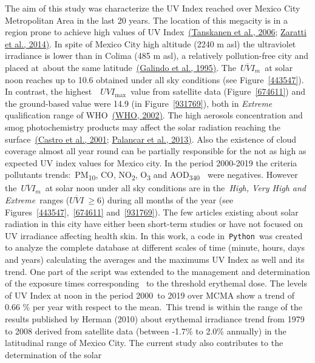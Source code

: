 \documentclass[10pt]{article}
\begin{document}
{\label{507127}}

The aim of this study was characterize the UV Index reached over Mexico
City Metropolitan Area in the last 20 years. The location of this
megacity is in a region prone to achieve high values of UV
Index~\hyperref[csl:27]{(Tanskanen et al., 2006}; \hyperref[csl:26]{Zaratti et al., 2014)}. In spite of Mexico City high altitude (2240 m
asl) the ultraviolet irradiance is lower than in Colima (485 m asl), a
relatively pollution-free city and placed at~about the same
latitude~\hyperref[csl:19]{(Galindo et al., 1995)}. The~\(\overline{UVI}_m\)~at solar noon
reaches up to 10.6 obtained under all sky conditions (see
Figure~{\ref{443547}}). In contrast, the
highest~~\(UVI_{\max}\)~value from satellite data
(Figure~{\ref{674611}}) and the ground-based value were
14.9 (in Figure~{\ref{931769}}), both in \emph{Extreme}
qualification range of WHO~\hyperref[csl:24]{(WHO, 2002)}. The high aerosols
concentration and smog photochemistry products may affect the solar
radiation reaching the surface~\hyperref[csl:14]{(Castro et al., 2001}; \hyperref[csl:13]{Palancar et al., 2013)}. Also the existence of
cloud coverage almost all year round can be partially responsible for
the not as high as expected UV index values for Mexico city. In the
period 2000-2019 the criteria pollutants trends:~PM\textsubscript{10},
CO, NO\textsubscript{2}, O\textsubscript{3} and
AOD\textsubscript{340~}~were negatives. However
the~\(\overline{UVI}_m\)~at solar noon under all sky conditions are in
the\emph{~High, Very High and Extreme}~ranges (\(\overline{UVI}\ \ge6\))
during all months of the year (see
Figures~{\ref{443547}},~{\ref{674611}}
and~{\ref{931769}}). The few articles existing about
solar radiation in this city have either been short-term studies or have
not focused on UV irradiance affecting health skin. In this work, a code
in~\texttt{Python}~was created to analyze the complete database at
different scales of time (minute, hours, days and years) calculating the
averages and the maximums UV Index as well and its trend. One part of
the script was extended to the management and determination of the
exposure times corresponding~ to the threshold erythemal dose. The
levels of UV Index at noon in the period 2000~to 2019 over MCMA show a
trend of 0.66 \% per year with respect to the mean.~This trend is within
the range of the results published by Herman (2010) about erythemal
irradiance trend from 1979 to 2008 derived from satellite data (between
-1.7\% to 2.0\% annually) in the latitudinal range of Mexico City. The
current study also contributes to the determination of the solar
\end{document}
